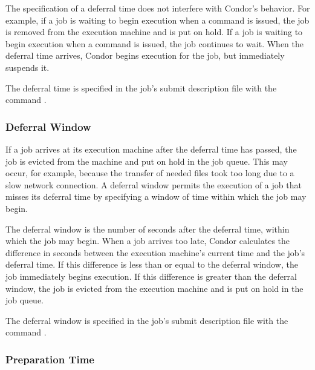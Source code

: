 The specification of a deferral time does not interfere
with Condor's behavior.
For example, if a job is waiting to begin execution
when a  command is issued,
the job is removed from the execution machine and is put on hold.
If a job is waiting to begin execution when 
a  command is issued,
the job continues to wait.
When the deferral time arrives,
Condor begins execution for the job,
but immediately suspends it.

The deferral time is specified in the job's submit description file
with the command .

\subsubsection{Deferral Window}
\label{sec:JobDeferral-DeferralWindow}

If a job arrives at its execution machine
after the deferral time has passed,
the job is evicted from the machine and put on hold in the job queue.
This may occur, for example,
because the transfer of needed files took too long
due to a slow network connection.
A deferral window permits the execution of a job
that misses its deferral time by specifying a window of
time within which the job may begin.

The deferral window 
is the number of seconds after the deferral time,
within which the job may begin.
When a job arrives too late,
Condor calculates the difference in seconds
between the execution machine's current time
and the job's deferral time.
If this difference is less than or equal to the deferral window,
the job immediately begins execution.
If this difference is greater than the deferral window,
the job is evicted from the execution machine
and is put on hold in the job queue.

The deferral window is specified in the job's submit description file
with the command .

\subsubsection{Preparation Time}
\label{sec:JobDeferral-PrepTime}

